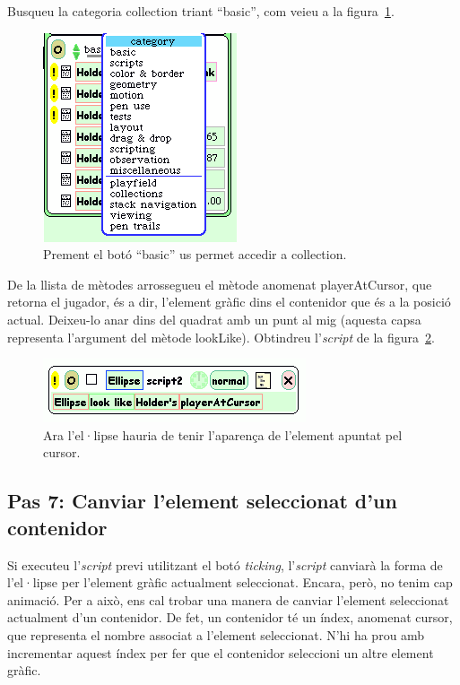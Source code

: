 Busqueu la categoria \textsf{collection} triant ``\textsf{basic}'', com veieu a la figura~\ref{fig2426}.  
\begin{figure}[h!]
\begin{center}
\includegraphics[scale=0.5]{Imatges/figura24-26}
\end{center}
\caption{Prement el botó ``\textsf{\upshape basic}'' us permet accedir a \textsf{\upshape collection}.}
\label{fig2426}
\end{figure}

De la llista de mètodes arrossegueu el mètode anomenat \textsf{playerAtCursor}, que retorna el jugador, és a dir, l'element gràfic dins el contenidor que és a la posició actual. Deixeu-lo anar dins del quadrat amb un punt al mig (aquesta capsa representa l'argument del mètode \textsf{lookLike}). Obtindreu l'\emph{script} de la figura~\ref{fig2427}.  
\begin{figure}[h!]
\begin{center}
\includegraphics[scale=0.6]{Imatges/figura24-27}
\end{center}
\caption{Ara l'el·lipse hauria de tenir l'aparença de l'element apuntat pel cursor.}
\label{fig2427}
\end{figure}

\subsection{Pas 7: Canviar l'element seleccionat d'un contenidor}
Si executeu l'\emph{script} previ utilitzant el botó \emph{ticking}, l'\emph{script} canviarà la forma de l'el·lipse per l'element gràfic actualment seleccionat. Encara, però, no tenim cap animació. Per a això, ens cal trobar una manera de canviar l'element seleccionat actualment d'un contenidor. De fet, un contenidor té un índex, anomenat \textsf{cursor}, que representa el nombre associat a l'element seleccionat. N'hi ha prou amb incrementar aquest índex per fer que el contenidor seleccioni un altre element gràfic.

